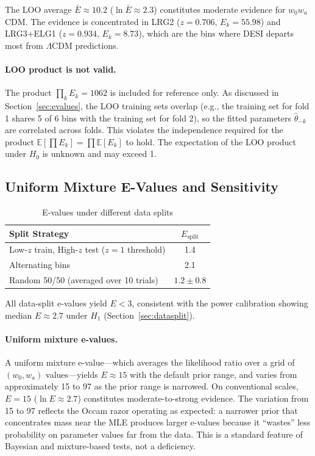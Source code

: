\documentclass[11pt,a4paper]{article}
\newcommand{\E}{\mathbb{E}}
\newcommand{\LCDM}{$\Lambda$CDM}
\begin{document}
The LOO average $\bar{E} \approx 10.2$ ($\ln \bar{E} \approx 2.3$) constitutes moderate evidence for $w_0w_a$CDM. The evidence is concentrated in LRG2 ($z = 0.706$, $E_k = 55.98$) and LRG3+ELG1 ($z = 0.934$, $E_k = 8.73$), which are the bins where DESI departs most from \LCDM{} predictions.

\paragraph{LOO product is not valid.} The product $\prod_k E_k = 1062$ is included for reference only. As discussed in Section~\ref{sec:evalues}, the LOO training sets overlap (e.g., the training set for fold 1 shares 5 of 6 bins with the training set for fold 2), so the fitted parameters $\hat{\theta}_{-k}$ are correlated across folds. This violates the independence required for the product $\E[\prod E_k] = \prod \E[E_k]$ to hold. The expectation of the LOO product under $H_0$ is unknown and may exceed 1.

\subsection{Uniform Mixture E-Values and Sensitivity}
\label{sec:mixture}

\begin{table}[H]
\centering
\caption{E-values under different data splits}
\label{tab:splits}
\begin{tabular}{@{}lc@{}}
\toprule
Split Strategy & $E_{\text{split}}$ \\
\midrule
Low-$z$ train, High-$z$ test ($z = 1$ threshold) & 1.4 \\
Alternating bins & 2.1 \\
Random 50/50 (averaged over 10 trials) & $1.2 \pm 0.8$ \\
\bottomrule
\end{tabular}
\end{table}

All data-split e-values yield $E < 3$, consistent with the power calibration showing median $E \approx 2.7$ under $H_1$ (Section~\ref{sec:datasplit}).

\paragraph{Uniform mixture e-values.} A uniform mixture e-value---which averages the likelihood ratio over a grid of $(w_0, w_a)$ values---yields $E \approx 15$ with the default prior range, and varies from approximately 15 to 97 as the prior range is narrowed. On conventional scales, $E = 15$ ($\ln E \approx 2.7$) constitutes moderate-to-strong evidence. The variation from 15 to 97 reflects the Occam razor operating as expected: a narrower prior that concentrates mass near the MLE produces larger e-values because it ``wastes'' less probability on parameter values far from the data. This is a standard feature of Bayesian and mixture-based tests, not a deficiency.
\end{document}
